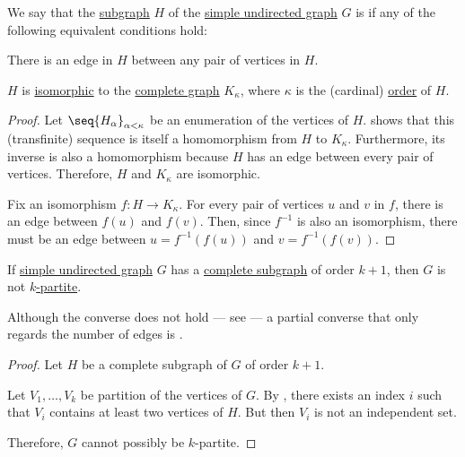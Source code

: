 \begin{definition}\label{def:complete_subgraph}\mimprovised
  We say that the \hyperref[def:undirected_graph/subgraph]{subgraph} \( H \) of the \hyperref[def:undirected_graph]{simple undirected graph} \( G \) is  if any of the following equivalent conditions hold:
  \begin{thmenum}
     There is an edge in \( H \) between any pair of vertices in \( H \).

     \( H \) is \hyperref[def:undirected_graph/homomorphism]{isomorphic} to the \hyperref[def:complete_graph]{complete graph} \( K_\kappa \), where \( \kappa \) is the (cardinal) \hyperref[def:graph_cardinality/order]{order} of \( H \).
  \end{thmenum}
\end{definition}
\begin{proof}
   Let \( \seq{ H_\alpha }_{\alpha < \kappa} \) be an enumeration of the vertices of \( H \).  shows that this (transfinite) sequence is itself a homomorphism from \( H \) to \( K_\kappa \). Furthermore, its inverse is also a homomorphism because \( H \) has an edge between every pair of vertices. Therefore, \( H \) and \( K_\kappa \) are isomorphic.

   Fix an isomorphism \( f: H \to K_\kappa \). For every pair of vertices \( u \) and \( v \) in \( f \), there is an edge between \( f(u) \) and \( f(v) \). Then, since \( f^{-1} \) is also an isomorphism, there must be an edge between \( u = f^{-1}(f(u)) \) and \( v = f^{-1}(f(v)) \).
\end{proof}

\begin{proposition}\label{thm:multipartite_graph_complete_subgraph}
  If \hyperref[def:undirected_graph]{simple undirected graph} \( G \) has a \hyperref[def:complete_subgraph]{complete subgraph} of order \( k+1 \), then \( G \) is not \hyperref[def:multipartite_graph]{\( k \)-partite}.
\end{proposition}
\begin{comments}
  \item Although the converse does not hold --- see  --- a partial converse that only regards the number of edges is .
\end{comments}
\begin{proof}
  Let \( H \) be a complete subgraph of \( G \) of order \( k + 1 \).

  Let \( V_1, \ldots, V_k \) be  partition of the vertices of \( G \). By , there exists an index \( i \) such that \( V_i \) contains at least two vertices of \( H \). But then \( V_i \) is not an independent set.

  Therefore, \( G \) cannot possibly be \( k \)-partite.
\end{proof}

